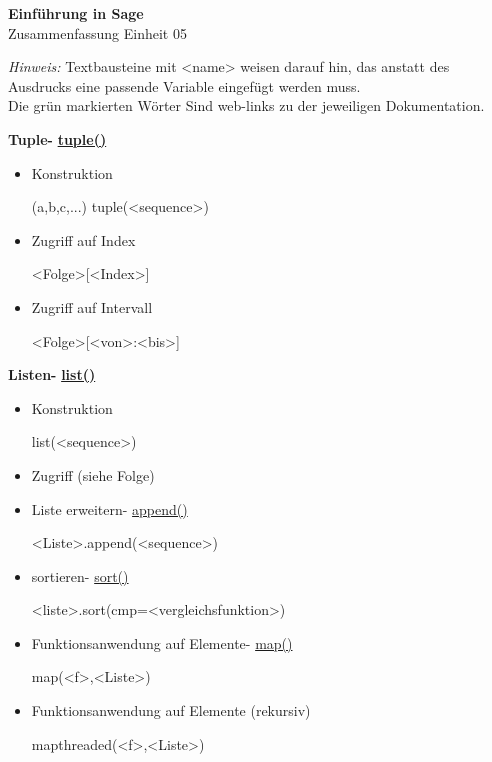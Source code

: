 \documentclass[a4paper,9pt,DIV15,twocolumn]{scrartcl}
\begin{document}
\begin{center}
    \textbf{\LARGE Einführung in Sage}\\
    {\large Zusammenfassung Einheit 05}
\end{center}
\textsl{Hinweis:} Textbausteine mit <name> weisen darauf hin, das anstatt des Ausdrucks eine passende Variable eingefügt werden muss.\\
Die {\color{Green}grün} markierten Wörter Sind web-links zu der jeweiligen Dokumentation.

\medskip
\textbf{Tuple- } \href{http://docs.python.org/library/functions.html#tuple}{\textbf{tuple()}}
\begin{itemize}
 \item Konstruktion
\begin{sagein}
 (a,b,c,...)
 tuple(<sequence>)
\end{sagein}
 \item Zugriff auf Index
\begin{sagein}
<Folge>[<Index>]
\end{sagein}
 \item Zugriff auf Intervall
\begin{sagein}
<Folge>[<von>:<bis>]
\end{sagein}
\end{itemize}


\textbf{Listen- } \href{http://docs.python.org/library/functions.html#list}{\textbf{list()}}
\begin{itemize}
 \item Konstruktion
\begin{sagein}
[a,b,c,...] 
list(<sequence>)
\end{sagein}
\item Zugriff (siehe Folge)
\item Liste erweitern- \href{https://sage.math.uni-goettingen.de/doc/static/reference/sage/misc/explain_pickle.html?highlight=append#sage.misc.explain_pickle.TestAppendList}{append()}
\begin{sagein}
<Liste>.append(<sequence>)
\end{sagein}
\item sortieren- \href{https://sage.math.uni-goettingen.de/doc/static/reference/sage/structure/sequence.html?highlight=sort#sage.structure.sequence.Sequence_generic.sort}{sort()}
\begin{sagein}
 <liste>.sort(cmp=<vergleichsfunktion>)
\end{sagein}
\item Funktionsanwendung auf Elemente- \href{https://sage.math.uni-goettingen.de/doc/static/reference/sage/combinat/generator.html?highlight=map#sage.combinat.generator.map}{map()}
\begin{sagein}
 map(<f>,<Liste>)
\end{sagein}
\item Funktionsanwendung auf Elemente (rekursiv)
\begin{sagein}
 mapthreaded(<f>,<Liste>)
\end{sagein}
\end{itemize}
\end{document}
